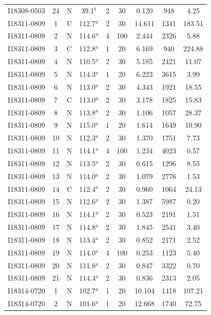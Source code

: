 \begin{table}
\begin{tabular}{ccccccccc}
I18308-0503 & 24 & N & 39.1$^{b}$ & 2 & 30 & 0.120 & 948 & 4.25 \\
I18311-0809 & 1 & U & 112.7$^{a}$ & 2 & 30 & 14.611 & 1341 & 183.51 \\
I18311-0809 & 2 & N & 114.6$^{a}$ & 4 & 100 & 2.444 & 2326 & 5.88 \\
I18311-0809 & 3 & C & 112.8$^{a}$ & 1 & 20 & 6.169 & 940 & 224.88 \\
I18311-0809 & 4 & N & 110.5$^{a}$ & 2 & 30 & 5.185 & 2421 & 11.07 \\
I18311-0809 & 5 & N & 114.3$^{a}$ & 1 & 20 & 6.223 & 3615 & 3.99 \\
I18311-0809 & 6 & N & 113.0$^{a}$ & 2 & 30 & 4.343 & 1921 & 18.55 \\
I18311-0809 & 7 & C & 113.0$^{a}$ & 2 & 30 & 3.178 & 1825 & 15.83 \\
I18311-0809 & 8 & N & 113.8$^{a}$ & 2 & 30 & 1.106 & 1057 & 28.37 \\
I18311-0809 & 9 & N & 115.0$^{a}$ & 1 & 20 & 1.614 & 1649 & 10.90 \\
I18311-0809 & 10 & N & 112.3$^{a}$ & 2 & 30 & 1.370 & 1751 & 7.73 \\
I18311-0809 & 11 & N & 114.1$^{a}$ & 4 & 100 & 1.234 & 4023 & 0.57 \\
I18311-0809 & 12 & N & 113.5$^{a}$ & 2 & 30 & 0.615 & 1296 & 8.55 \\
I18311-0809 & 13 & N & 114.0$^{a}$ & 2 & 30 & 1.079 & 2776 & 1.53 \\
I18311-0809 & 14 & C & 112.4$^{a}$ & 2 & 30 & 0.960 & 1064 & 24.13 \\
I18311-0809 & 15 & N & 112.6$^{a}$ & 2 & 30 & 1.387 & 5987 & 0.20 \\
I18311-0809 & 16 & N & 114.1$^{a}$ & 2 & 30 & 0.523 & 2191 & 1.51 \\
I18311-0809 & 17 & N & 114.8$^{a}$ & 2 & 30 & 1.845 & 2541 & 3.40 \\
I18311-0809 & 18 & N & 113.4$^{a}$ & 2 & 30 & 0.852 & 2171 & 2.52 \\
I18311-0809 & 19 & N & 114.0$^{a}$ & 4 & 100 & 0.253 & 1123 & 5.40 \\
I18311-0809 & 20 & N & 111.8$^{a}$ & 2 & 30 & 0.847 & 3322 & 0.70 \\
I18311-0809 & 21 & N & 114.4$^{a}$ & 2 & 30 & 0.836 & 2313 & 2.05 \\
I18314-0720 & 1 & N & 102.7$^{a}$ & 1 & 20 & 10.104 & 1418 & 107.21 \\
I18314-0720 & 2 & N & 101.6$^{a}$ & 1 & 20 & 12.668 & 1740 & 72.75 \\

\end{tabular}
\end{table}
